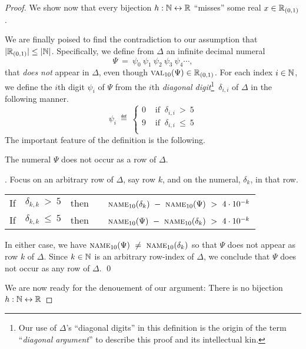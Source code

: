 \begin{proof}
\medskip

We show now that every bijection $h: \mathbb{N} \leftrightarrow \mathbb{R}$ ``misses''
some real $x \in \mathbb{R}_{(0,1)}$.

We are finally poised to find the contradiction to our assumption that
$|\mathbb{R}_{(0,1)}| \leq |\mathbb{N}|$.  Specifically, we define from $\Delta$ an
infinite decimal numeral
\[ \Psi \ = \ \psi_0 \ \psi_1 \ \psi_2 \ \psi_3 \ \psi_4 \cdots, \]
that {\em does not} appear in $\Delta$, even though $\mbox{\sc
  val}_{10}(\Psi) \in \mathbb{R}_{(0,1)}$.  For each index $i \in \mathbb{N}$, we
define the $i$th digit $\psi_i$ of $\Psi$ from the $i$th {\em diagonal
  digit}\footnote{Our use of $\Delta$'s ``diagonal digits'' in this
  definition is the origin of the term ``{\em diagonal argument}'' to
  describe this proof and its intellectual kin.}~$\delta_{i,i}$ of
$\Delta$ in the following manner.
\[ \psi_i \ \eqdef \
\left\{
\begin{array}{cc}
0 & \mbox{ if } \ \delta_{i,i} \ > \ 5 \\
9 & \mbox{ if } \ \delta_{i,i} \ \leq \ 5 \\
\end{array}
\right.
\]
The important feature of the definition is the following.

\begin{lemma}
\label{lem:PSI-notin-DELTA-num}
The numeral $\Psi$ does not occur as a row of $\Delta$.
\end{lemma}

.
Focus on an arbitrary row of $\Delta$, say row $k$, and on the numeral,
$\delta_k$, in that row.

\begin{tabular}{lclc}
If & $\delta_{k,k} \ > \ 5$ & then & \ \
$\mbox{\sc name}_{10}(\delta_k) \ - \ \mbox{\sc name}_{10}(\Psi) \ > \ 4
\cdot 10^{-k}$ \\
If & $\delta_{k,k} \ \leq \ 5$ & then & \ \
$\mbox{\sc name}_{10}(\Psi) \ - \ \mbox{\sc name}_{10}(\delta_k) \ > \ 4
\cdot 10^{-k}$
\end{tabular}

\noindent
In either case, we have $\mbox{\sc name}_{10}(\Psi) \ \neq \ \mbox{\sc
  name}_{10}(\delta_k)$ so that $\Psi$ does not appear as row $k$ of
$\Delta$.  Since $k \in \mathbb{N}$ is an arbitrary row-index of $\Delta$, we
conclude that $\Psi$ does not occur as any row of $\Delta$.  \qed

\medskip

We are now ready for the denouement of our argument: There is no
bijection $h: \mathbb{N} \leftrightarrow \mathbb{R}$


\end{proof}
